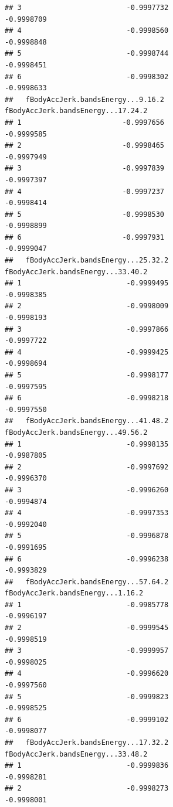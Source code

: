 \documentclass[
]{article}
\begin{document}
\begin{verbatim}
## 3                         -0.9997732                       -0.9998709
## 4                         -0.9998560                       -0.9998848
## 5                         -0.9998744                       -0.9998451
## 6                         -0.9998302                       -0.9998633
##   fBodyAccJerk.bandsEnergy...9.16.2 fBodyAccJerk.bandsEnergy...17.24.2
## 1                        -0.9997656                         -0.9999585
## 2                        -0.9998465                         -0.9997949
## 3                        -0.9997839                         -0.9997397
## 4                        -0.9997237                         -0.9998414
## 5                        -0.9998530                         -0.9998899
## 6                        -0.9997931                         -0.9999047
##   fBodyAccJerk.bandsEnergy...25.32.2 fBodyAccJerk.bandsEnergy...33.40.2
## 1                         -0.9999495                         -0.9998385
## 2                         -0.9998009                         -0.9998193
## 3                         -0.9997866                         -0.9997722
## 4                         -0.9999425                         -0.9998694
## 5                         -0.9998177                         -0.9997595
## 6                         -0.9998218                         -0.9997550
##   fBodyAccJerk.bandsEnergy...41.48.2 fBodyAccJerk.bandsEnergy...49.56.2
## 1                         -0.9998135                         -0.9987805
## 2                         -0.9997692                         -0.9996370
## 3                         -0.9996260                         -0.9994874
## 4                         -0.9997353                         -0.9992040
## 5                         -0.9996878                         -0.9991695
## 6                         -0.9996238                         -0.9993829
##   fBodyAccJerk.bandsEnergy...57.64.2 fBodyAccJerk.bandsEnergy...1.16.2
## 1                         -0.9985778                        -0.9996197
## 2                         -0.9999545                        -0.9998519
## 3                         -0.9999957                        -0.9998025
## 4                         -0.9996620                        -0.9997560
## 5                         -0.9999823                        -0.9998525
## 6                         -0.9999102                        -0.9998077
##   fBodyAccJerk.bandsEnergy...17.32.2 fBodyAccJerk.bandsEnergy...33.48.2
## 1                         -0.9999836                         -0.9998281
## 2                         -0.9998273                         -0.9998001

\end{verbatim}
\end{document}

